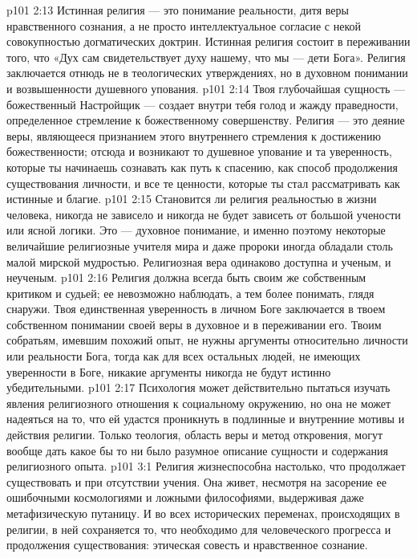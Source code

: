 \vs p101 2:13 Истинная религия --- это понимание реальности, дитя веры нравственного сознания, а не просто интеллектуальное согласие с некой совокупностью догматических доктрин. Истинная религия состоит в переживании того, что «Дух сам свидетельствует духу нашему, что мы --- дети Бога». Религия заключается отнюдь не в теологических утверждениях, но в духовном понимании и возвышенности душевного упования.
\vs p101 2:14 Твоя глубочайшая сущность --- божественный Настройщик --- создает внутри тебя голод и жажду праведности, определенное стремление к божественному совершенству. Религия --- это деяние веры, являющееся признанием этого внутреннего стремления к достижению божественности; отсюда и возникают то душевное упование и та уверенность, которые ты начинаешь сознавать как путь к спасению, как способ продолжения существования личности, и все те ценности, которые ты стал рассматривать как истинные и благие.
\vs p101 2:15 \pc Становится ли религия реальностью в жизни человека, никогда не зависело и никогда не будет зависеть от большой учености или ясной логики. Это --- духовное понимание, и именно поэтому некоторые величайшие религиозные учителя мира и даже пророки иногда обладали столь малой мирской мудростью. Религиозная вера одинаково доступна и ученым, и неученым.
\vs p101 2:16 Религия должна всегда быть своим же собственным критиком и судьей; ее невозможно наблюдать, а тем более понимать, глядя снаружи. Твоя единственная уверенность в личном Боге заключается в твоем собственном понимании своей веры в духовное и в переживании его. Твоим собратьям, имевшим похожий опыт, не нужны аргументы относительно личности или реальности Бога, тогда как для всех остальных людей, не имеющих уверенности в Боге, никакие аргументы никогда не будут истинно убедительными.
\vs p101 2:17 Психология может действительно пытаться изучать явления религиозного отношения к социальному окружению, но она не может надеяться на то, что ей удастся проникнуть в подлинные и внутренние мотивы и действия религии. Только теология, область веры и метод откровения, могут вообще дать какое бы то ни было разумное описание сущности и содержания религиозного опыта.
\vs p101 3:1 Религия жизнеспособна настолько, что продолжает существовать и при отсутствии учения. Она живет, несмотря на засорение ее ошибочными космологиями и ложными философиями, выдерживая даже метафизическую путаницу. И во всех исторических переменах, происходящих в религии, в ней сохраняется то, что необходимо для человеческого прогресса и продолжения существования: этическая совесть и нравственное сознание.
